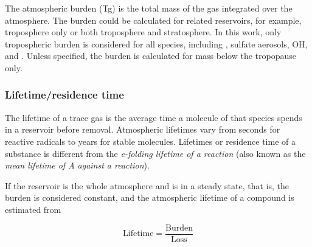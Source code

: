 The atmospheric burden (Tg) is the total mass of the gas integrated over the atmosphere. The burden could be calculated for related reservoirs, for example, troposphere only or both troposphere and stratosphere. In this work, only tropospheric burden is considered for all species, including , sulfate aerosols, OH,  and . Unless specified, the burden is calculated for mass below the tropopause only.

\subsubsection{Lifetime/residence time}

The lifetime of a trace gas is the average time a molecule of that species spends in a reservoir before removal. Atmospheric lifetimes vary from seconds for reactive radicals to years for stable molecules. Lifetimes or residence time of a substance is different from the \textit{e-folding lifetime of a reaction} (also known as the \textit{mean lifetime of A against a reaction}). 

If the reservoir is the whole atmosphere and is in a steady state, that is, the burden is considered constant, and the atmospheric lifetime of a compound is estimated from 

\begin{equation}
\label{eq:lifetime}
 \text{Lifetime} = \frac{\text{Burden}}{\text{Loss}}    
\end{equation}
